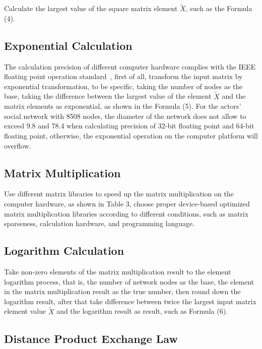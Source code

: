\documentclass[review]{cvpr}
\begin{document}
Calculate the largest value of the square matrix element $\widetilde X$, such as the Formula (4).

\subsection{Exponential Calculation}

The calculation precision of different computer hardware complies with the IEEE floating point operation standard~\cite{ieee1985ieee},
first of all, transform the input matrix by exponential transformation, to be specific, taking the number of nodes as the base,
taking the difference between the largest value of the element $\widetilde X$ and the matrix elements as exponential, as shown in the Formula (5).
For the actors' social network with 8508 nodes, the diameter of the network does not allow to exceed 9.8 and 78.4 when calculating precision of 32-bit floating point and 64-bit floating point,
otherwise, the exponential operation on the computer platform will overflow.

\subsection{Matrix Multiplication}
Use different matrix libraries to speed up the matrix multiplication on the computer hardware, as shown in Table 3, choose proper device-based optimized matrix multiplication libraries according to different conditions, such as matrix sparseness, calculation hardware, and programming language.

\subsection{Logarithm Calculation}
Take non-zero elements of the matrix multiplication result to the element logarithm process, that is, the number of network nodes as the base, the element in the matrix multiplication result as the true number, then round down the logarithm result,
after that take difference between twice the largest input matrix element value $\widetilde X$ and the logarithm result as result, such as Formula (6).

\subsection{Distance Product Exchange Law}
\end{document}
